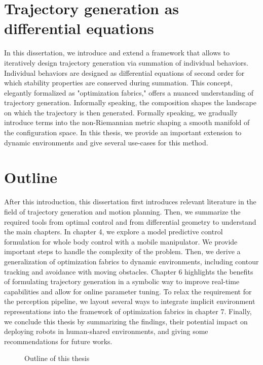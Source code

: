 \section{Trajectory generation as differential equations}

In this dissertation, we introduce and extend a framework
that allows to iteratively design trajectory generation via
summation of individual behaviors. Individual behaviors are
designed as differential equations of second order for which
stability properties are conserved during summation.
This concept, elegantly formalized as "optimization
fabrics," offers a nuanced understanding of trajectory
generation. Informally speaking, the composition shapes the
landscape on which the trajectory is then generated.
Formally speaking, we gradually introduce terms into the
non-Riemannian metric shaping a smooth manifold of the
configuration space. In this thesis, we provide an important
extension to dynamic environments and give several use-cases
for this method.


\section{Outline}

After this introduction, this dissertation first introduces
relevant literature in the field of trajectory generation
and motion planning. Then, we summarize the required tools
from optimal control and from differential geometry to
understand the main chapters. In chapter 4, we explore a
model predictive control formulation for whole body control
with a mobile manipulator. We provide important steps to
handle the complexity of the problem. Then, we derive a
generalization of optimization fabrics to dynamic
environments, including contour tracking and avoidance with
moving obstacles. Chapter 6 highlights the benefits of
formulating trajectory generation in a symbolic way to
improve real-time capabilities and allow for online
parameter tuning. To relax the requirement for the
perception pipeline, we layout several ways to integrate
implicit environment representations into the framework of
optimization fabrics in chapter 7. Finally, we conclude this
thesis by summarizing the findings, their potential impact
on deploying robots in human-shared environments, and giving some
recommendations for future works.

\begin{figure}
  \begin{center}
    
  \end{center}
  \caption{Outline of this thesis}
  \label{fig:outline}
\end{figure}

